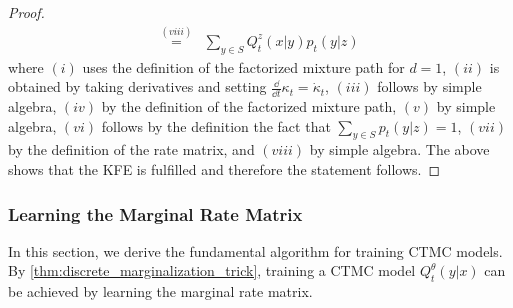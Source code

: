 \begin{examplebox}
\begin{proof}
\begin{align*}
\overset{(viii)}{=}&\sum\limits_{y\in S}Q_t^z(x|y)p_t(y|z)
\end{align*}
where $(i)$ uses the definition of the factorized mixture path for $d=1$, $(ii)$ is obtained by taking derivatives and setting $\frac{\dd}{\dd t}\kappa_t=\dot{\kappa}_t$, $(iii)$ follows by simple algebra, $(iv)$ by the definition of the factorized mixture path, $(v)$ by simple algebra, $(vi)$ follows by the definition the fact that $\sum_{y\in S}p_t(y|z)=1$, $(vii)$ by the definition of the rate matrix, and $(viii)$ by simple algebra. The above shows that the KFE is fulfilled and therefore the statement follows.
\end{proof}
\end{examplebox}

\subsubsection{Learning the Marginal Rate Matrix}
In this section, we derive the fundamental algorithm for training CTMC models. By \cref{thm:discrete_marginalization_trick}, training a  CTMC model $Q_t^\theta(y|x)$ can be achieved by learning the marginal rate matrix. 

